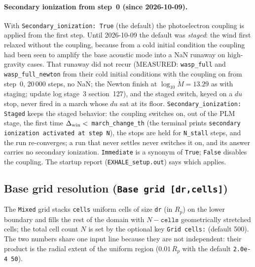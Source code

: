 \documentclass[english,a4paper]{my_memo}
\newcommand{\rp}{\ensuremath{R_p}}   %
\begin{document}
\paragraph{Secondary ionization from step~0 (since 2026-10-09).} With
\texttt{Secondary\_ionization: True} (the default) the photoelectron coupling
is applied from the first step. Until 2026-10-09 the default was \emph{staged}:
the wind first relaxed without the coupling, because from a cold initial
condition the coupling had been seen to amplify the base acoustic mode into a
NaN runaway on high-gravity cases. That runaway did not recur (MEASURED:
\texttt{wasp\_full} and \texttt{wasp\_full\_newton} from their cold initial
conditions with the coupling on from step~0, 20\,000 steps, no NaN; the Newton
finish at $\log_{10}\dot M=13.29$ as with staging; update log stage~3
section~127), and the staged switch, keyed on a $du$ stop, never fired in a
march whose $du$ sat at its floor. \texttt{Secondary\_ionization: Staged} keeps
the staged behavior: the coupling switches on, out of the PLM stage, the first
time $\Delta_{\rm win}<$~\texttt{march\_change\_th} (the terminal prints
\texttt{secondary ionization activated at step N}), the stops are held for
\texttt{N\_stall} steps, and the run re-converges; a run that never settles
never switches it on, and its answer carries no secondary ionization.
\texttt{Immediate} is a synonym of \texttt{True}; \texttt{False} disables the
coupling. The startup report (\texttt{EXHALE\_setup.out}) says which applies.

\subsection{Base grid resolution (\texttt{Base grid [dr,cells]})}
\label{sec:basegrid}
The \texttt{Mixed} grid stacks \texttt{cells} uniform cells of size \texttt{dr}
(in \rp) on the lower boundary and fills the rest of the domain with
$N-\texttt{cells}$ geometrically stretched cells; the total cell count $N$ is
set by the optional key \texttt{Grid cells:} (default 500). The two numbers
share one input line because they are not independent: their product is the
radial extent of the uniform region ($0.01\,R_p$ with the default
\texttt{2.0e-4 50}).
\end{document}
